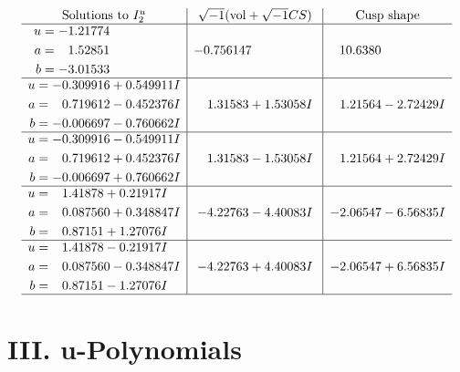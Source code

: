 \documentclass[1p]{elsarticle_modified}
\theoremstyle{definition}
\newcommand{\I}{\sqrt{-1}}
\begin{document}
$$\begin{array}{c|c|c}  
\text{Solutions to }I^u_{2}& \I (\text{vol} + \sqrt{-1}CS) & \text{Cusp shape}\\
 \hline 
\begin{aligned}
u &= -1.21774\phantom{ +0.000000I} \\
a &= \phantom{-}1.52851\phantom{ +0.000000I} \\
b &= -3.01533\phantom{ +0.000000I}\end{aligned}
 & -0.756147\phantom{ +0.000000I} & \phantom{-}10.6380\phantom{ +0.000000I} \\ \hline\begin{aligned}
u &= -0.309916 + 0.549911 I \\
a &= \phantom{-}0.719612 - 0.452376 I \\
b &= -0.006697 - 0.760662 I\end{aligned}
 & \phantom{-}1.31583 + 1.53058 I & \phantom{-}1.21564 - 2.72429 I \\ \hline\begin{aligned}
u &= -0.309916 - 0.549911 I \\
a &= \phantom{-}0.719612 + 0.452376 I \\
b &= -0.006697 + 0.760662 I\end{aligned}
 & \phantom{-}1.31583 - 1.53058 I & \phantom{-}1.21564 + 2.72429 I \\ \hline\begin{aligned}
u &= \phantom{-}1.41878 + 0.21917 I \\
a &= \phantom{-}0.087560 + 0.348847 I \\
b &= \phantom{-}0.87151 + 1.27076 I\end{aligned}
 & -4.22763 - 4.40083 I & -2.06547 - 6.56835 I \\ \hline\begin{aligned}
u &= \phantom{-}1.41878 - 0.21917 I \\
a &= \phantom{-}0.087560 - 0.348847 I \\
b &= \phantom{-}0.87151 - 1.27076 I\end{aligned}
 & -4.22763 + 4.40083 I & -2.06547 + 6.56835 I\\
 \hline 
 \end{array}$$\newpage
\newpage\renewcommand{\arraystretch}{1}
\centering \section*{ III. u-Polynomials}
\end{document}
